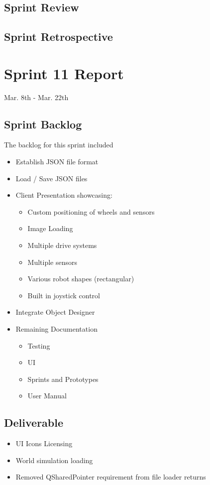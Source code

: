 \subsection{Sprint Review}


\subsection{Sprint Retrospective}
\section{Sprint 11 Report}
Mar. 8th - Mar. 22th
\subsection{Sprint Backlog}

The backlog for this sprint included

\begin{itemize}
	\item Establish JSON file format
	\item Load / Save JSON files	
	\item Client Presentation showcasing:
	\begin{itemize}
		\item Custom positioning of wheels and sensors
		\item Image Loading	
		\item Multiple drive systems
		\item Multiple sensors
		\item Various robot shapes (rectangular)
		\item Built in joystick control
	\end{itemize}
	\item Integrate Object Designer
	\item Remaining Documentation	
	\begin{itemize}
		\item Testing
		\item UI
		\item Sprints and Prototypes
		\item User Manual
	\end{itemize}
\end{itemize}

\subsection{Deliverable}

\begin{itemize}
	\item UI Icons Licensing
	\item World simulation loading
	\item Removed QSharedPointer requirement from file loader returns
\end{itemize} 



